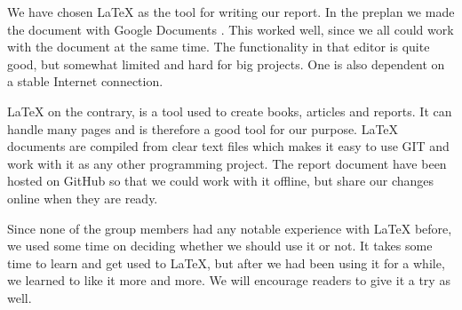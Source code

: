 We have chosen \LaTeX{} as the tool for writing our report. In the preplan we
made the document with Google Documents \cite{GoogleDrive}. This worked well, since
we all could work with the document at the same time. The functionality in that
editor is quite good, but somewhat limited and hard for big projects. One is
also dependent on a stable Internet connection. 

\LaTeX{} on the contrary, is a tool used to create books, articles and reports.
It can handle many pages and is therefore a good tool for our purpose. \LaTeX{}
documents are compiled from clear text files which makes it easy to use GIT and
work with it as any other programming project. The report document have been hosted
on GitHub so that we could work with it offline, but share our changes online
when they are ready.

Since none of the group members had any notable experience with \LaTeX{} 
before, we used some time on deciding whether we should use it or not. It takes
some time to learn and get used to \LaTeX{}, but after we had been using it for
a while, we learned to like it more and more. We will encourage readers to give
it a try as well.